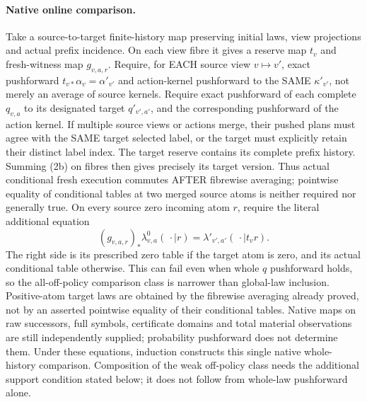 \documentclass{article}
\begin{document}
\paragraph{Native online comparison.}
Take a source-to-target finite-history map preserving initial laws, view projections and actual prefix incidence. On each view fibre it gives a reserve map $t_v$ and fresh-witness map $g_{v,a,r}$. Require, for EACH source view $v\mapsto v\prime$, exact pushforward $t_{v*}\alpha_v=\alpha\prime_{v\prime}$ and action-kernel pushforward to the SAME $\kappa\prime_{v\prime}$, not merely an average of source kernels. Require exact pushforward of each complete $q_{v,a}$ to its designated target $q'_{v',a'}$, and the corresponding pushforward of the action kernel. If multiple source views or actions merge, their pushed plans must agree with the SAME target selected label, or the target must explicitly retain their distinct label index. The target reserve contains its complete prefix history. Summing (2b) on fibres then gives precisely its target version. Thus actual conditional fresh execution commutes AFTER fibrewise averaging; pointwise equality of conditional tables at two merged source atoms is neither required nor generally true. On every source zero incoming atom $r$, require the literal additional equation
\[
 (g_{v,a,r})_*\lambda^0_{v,a}(\,\cdot\mid r)
 =\lambda\prime_{v\prime,a\prime}(\,\cdot\mid t_vr).\tag{2c}
\]
The right side is its prescribed zero table if the target atom is zero, and its actual conditional table otherwise. This can fail even when whole $q$ pushforward holds, so the all-off-policy comparison class is narrower than global-law inclusion. Positive-atom target laws are obtained by the fibrewise averaging already proved, not by an asserted pointwise equality of their conditional tables. Native maps on raw successors, full symbols, certificate domains and total material observations are still independently supplied; probability pushforward does not determine them. Under these equations, induction constructs this single native whole-history comparison. Composition of the weak off-policy class needs the additional support condition stated below; it does not follow from whole-law pushforward alone.
\end{document}
